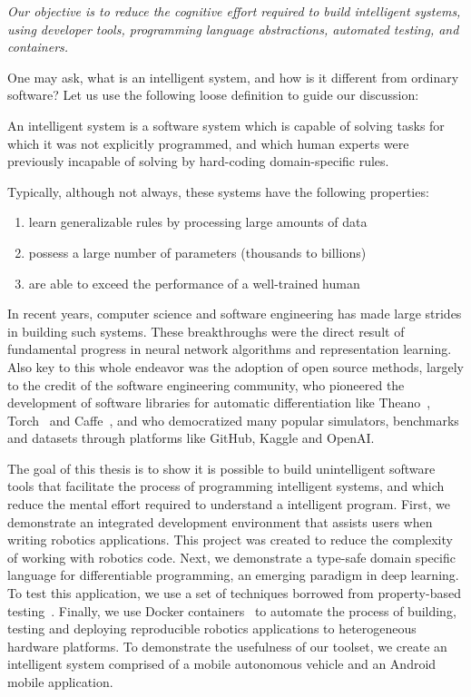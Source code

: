 \documentclass[12pt,initial,twoside,maitrise]{dms}
\numberwithin{equation}{section}
\numberwithin{table}{chapter}
\numberwithin{figure}{chapter}
\begin{document}
\textit{Our objective is to reduce the cognitive effort required to build intelligent systems, using developer tools, programming language abstractions, automated testing, and containers.}

One may ask, what is an intelligent system, and how is it different from ordinary software? Let us use the following loose definition to guide our discussion:

An intelligent system is a software system which is capable of solving tasks for which it was not explicitly programmed, and which human experts were previously incapable of solving by hard-coding domain-specific rules.

Typically, although not always, these systems have the following properties:

\begin{enumerate}
    \item learn generalizable rules by processing large amounts of data
    \item possess a large number of parameters (thousands to billions)
    \item are able to exceed the performance of a well-trained human
\end{enumerate}

In recent years, computer science and software engineering has made large strides in building such systems. These breakthroughs were the direct result of fundamental progress in neural network algorithms and representation learning. Also key to this whole endeavor was the adoption of open source methods, largely to the credit of the software engineering community, who pioneered the development of software libraries for automatic differentiation like Theano~\cite{DBLP:journals-corr-Al-RfouAAa16}, Torch~\cite{collobert2002torch} and Caffe~\cite{jia2014caffe}, and who democratized many popular simulators, benchmarks and datasets through platforms like GitHub, Kaggle and OpenAI.

The goal of this thesis is to show it is possible to build unintelligent software tools that facilitate the process of programming intelligent systems, and which reduce the mental effort required to understand a intelligent program. First, we demonstrate an integrated development environment that assists users when writing robotics applications. This project was created to reduce the complexity of working with robotics code. Next, we demonstrate a type-safe domain specific language for differentiable programming, an emerging paradigm in deep learning. To test this application, we use a set of techniques borrowed from property-based testing~\cite{fink1997property}. Finally, we use Docker containers~\cite{merkel2014docker} to automate the process of building, testing and deploying reproducible robotics applications to heterogeneous hardware platforms. To demonstrate the usefulness of our toolset, we create an intelligent system comprised of a mobile autonomous vehicle and an Android mobile application.
\end{document}

